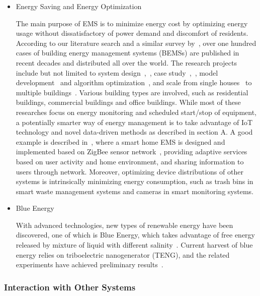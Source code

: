 \documentclass[letterpaper, twocolumn, 10pt, conference]{IEEEtran}
\begin{document}
\begin{itemize}

\item Energy Saving and Energy Optimization

The main purpose of EMS is to minimize energy cost by optimizing energy usage without dissatisfactory of power demand and discomfort of residents. According to our literature search and a similar survey by~\cite{lee2016energy}, over one hundred cases of building energy management systems (BEMSs) are published in recent decades and distributed all over the world. The research projects include but not limited to system design~\cite{wakui2012optimal},~\cite{olivares2014centralized}, case study~\cite{klein2012coordinating},~\cite{ma2009study}, model development~\cite{sehar2016energy} and algorithm optimization~\cite{shin2016energy}, and scale from single houses~\cite{berlad1976enthalpy} to multiple buildings~\cite{brown1984change}. Various building types are involved, such as residential buildings, commercial buildings and office buildings. While most of these researches focus on energy monitoring and scheduled start/stop of equipment, a potentially smarter way of energy management is to take advantage of IoT technology and novel data-driven methods as described in section A. A good example is described in~\cite{han2010design}, where a smart home EMS is designed and implemented based on ZigBee sensor network~\cite{gascon2009security}, providing adaptive services based on user activity and home environment, and sharing information to users through network. Moreover, optimizing device distributions of other systems is intrinsically minimizing energy consumption, such as trash bins in smart waste management systems and cameras in smart monitoring systems.

\item Blue Energy

With advanced technologies, new types of renewable energy have been discovered, one of which is Blue Energy, which takes advantage of free energy released by mixture of liquid with different salinity~\cite{fernandez2017new}. Current harvest of blue energy relies on triboelectric nanogenerator (TENG), and the related experiments have achieved preliminary results~\cite{xi2017multifunctional}. 
\end{itemize}



\subsubsection{Interaction with Other Systems}
\label{sssec:cyx:smart_energy:interaction}
\end{document}
